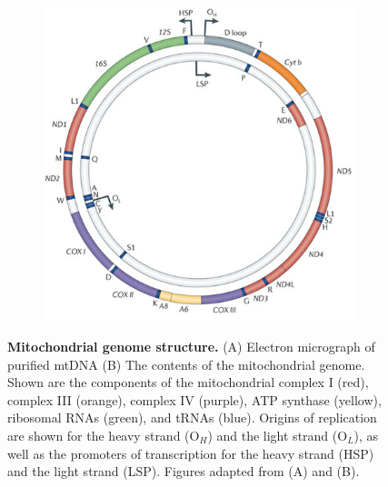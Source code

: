 \documentclass[12pt,twoside]{reedthesis}
\begin{document}
\begin{figure}[t!]
\begin{center}
\begin{subfigure}[t]{.6\textwidth}
        \includegraphics[width=0.9\linewidth]{../figures/mtdna_map_schon_2012.jpg}
        \label{mtdna:map}
    \end{subfigure}
    \caption[Mitochondrial genome structure.]{\textbf{Mitochondrial genome structure.} (A) Electron micrograph of purified mtDNA (B) The contents of the mitochondrial genome. Shown are the components of the mitochondrial complex I (red), complex III (orange), complex IV (purple), ATP synthase (yellow), ribosomal RNAs (green), and tRNAs (blue). Origins of replication are shown for the heavy strand (O$_{H}$) and the light strand (O$_{L}$), as well as the promoters of transcription for the heavy strand (HSP) and the light strand (LSP). Figures adapted from \citealp{nass_circularity_1966} (A) and  \citealp{schon_human_2012} (B).}
    \label{mtdna}
    \end{center}
\end{figure}
\end{document}
